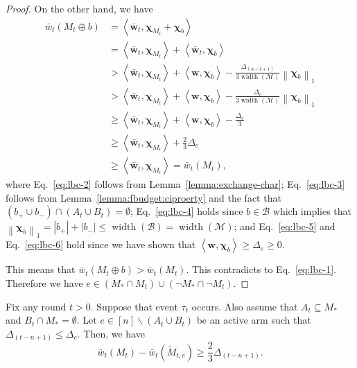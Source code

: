 \documentclass{article}
\newcommand{\M}{\mathcal M}
\newcommand{\B}{\mathcal B}
\newcommand{\del}{\backslash}
\DeclareMathOperator{\rank}{width}
\newcommand{\inn}[1]{\left\langle #1 \right\rangle}
\newcommand{\nor}[1]{\left\|#1\right\|}
\renewcommand{\vec}[1]{\boldsymbol{#1}}
\begin{document}
\begin{proof}
On the other hand, we have
\begin{align}
\bar w_t(M_t\oplus b) &= \inn{\vec{\bar w}_t, \vec \chi_{M_t} + \vec \chi_b} \label{eq:lbc-2}\\
									    &= \inn{\vec{\bar w}_t, \vec \chi_{M_t}} + \inn{\vec{\bar w}_t, \vec \chi_b}\nonumber\\
									    &> \inn{\vec{\bar w}_t, \vec \chi_{M_t}} + \inn{\vec w,\vec\chi_b} - \frac{\Delta_{(n-t+1)}}{3\rank(\M)} \nor{\vec\chi_b}_1 \label{eq:lbc-3} \\
										  &> \inn{\vec{\bar w}_t, \vec \chi_{M_t}} + \inn{\vec w,\vec\chi_b} - \frac{\Delta_{e}}{3\rank(\M)} \nor{\vec\chi_b}_1
										  \nonumber\\
										  &\ge \inn{\vec{\bar w}_t, \vec \chi_{M_t}} + \inn{\vec w,\vec\chi_b} - \frac{\Delta_e}{3}
										  \label{eq:lbc-4}\\
										  &\ge \inn{\vec{\bar w}_t, \vec \chi_{M_t}} + \frac{2}3 \Delta_e \label{eq:lbc-5}\\
										  &\ge \inn{\vec{\bar w}_t, \vec \chi_{M_t}} = \bar w_t(M_t), \label{eq:lbc-6}
\end{align}
where Eq.~\eqref{eq:lbc-2} follows from Lemma~\ref{lemma:exchange-char};
Eq.~\eqref{eq:lbc-3} follows from Lemma~\ref{lemma:fbudget:ciproerty} and the fact that $(b_+\cup b_-)\cap (A_t\cup B_t)=\emptyset$;
Eq.~\eqref{eq:lbc-4} holds since $b\in \B$ which implies that $\nor{\vec\chi_b}_1 = |b_+|+|b_-|\le\rank(\B)=\rank(\M)$;
and Eq.~\eqref{eq:lbc-5} and Eq.~\eqref{eq:lbc-6} hold since we have shown that $\inn{\vec w, \vec \chi_b} \ge \Delta_e \ge 0$.

This means that $\bar w_t(M_t \oplus b) > \bar w_t(M_t)$. 
This contradicts to Eq.~\eqref{eq:lbc-1}.
Therefore we have $e\in (M_* \cap M_t) \cup ( \neg M_* \cap \neg M_t)$.


\end{proof}

\begin{lemma}
\label{lemma-budget-c}
Fix any round $t>0$. 
Suppose that event $\tau_t$ occurs.
Also assume that $A_t \subseteq M_*$ and $B_t \cap M_* = \emptyset$.
Let $e \in [n] \del (A_t\cup B_t)$ be an active arm such that $\Delta_{(t-n+1)} \le \Delta_e$.
Then, we have 
$$
\bar w_t(M_t) - \bar w_t(\tilde M_{t,e}) \ge \frac23 \Delta_{(t-n+1)}.
$$
\end{lemma}
\end{document}
